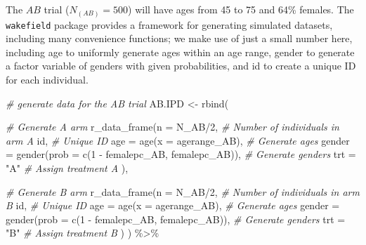 \documentclass[
]{article}
\newenvironment{Shaded}{\begin{snugshade}}{\end{snugshade}}
\newcommand{\AttributeTok}[1]{\textcolor[rgb]{0.77,0.63,0.00}{#1}}
\newcommand{\CommentTok}[1]{\textcolor[rgb]{0.56,0.35,0.01}{\textit{#1}}}
\newcommand{\DecValTok}[1]{\textcolor[rgb]{0.00,0.00,0.81}{#1}}
\newcommand{\FunctionTok}[1]{\textcolor[rgb]{0.00,0.00,0.00}{#1}}
\newcommand{\NormalTok}[1]{#1}
\newcommand{\OtherTok}[1]{\textcolor[rgb]{0.56,0.35,0.01}{#1}}
\newcommand{\SpecialCharTok}[1]{\textcolor[rgb]{0.00,0.00,0.00}{#1}}
\newcommand{\StringTok}[1]{\textcolor[rgb]{0.31,0.60,0.02}{#1}}
\begin{document}
The \(AB\) trial (\(N_{(AB)}=500\)) will have ages from 45 to 75 and
64\% females. The \texttt{wakefield} package provides a framework for
generating simulated datasets, including many convenience functions; we
make use of just a small number here, including age to uniformly
generate ages within an age range, gender to generate a factor variable
of genders with given probabilities, and id to create a unique ID for
each individual.

\begin{Shaded}
\begin{Highlighting}[]
\CommentTok{\# generate data for the AB trial}
\NormalTok{AB.IPD }\OtherTok{\textless{}{-}}
  \FunctionTok{rbind}\NormalTok{(}
    
    \CommentTok{\# Generate A arm}
    \FunctionTok{r\_data\_frame}\NormalTok{(}\AttributeTok{n =}\NormalTok{ N\_AB}\SpecialCharTok{/}\DecValTok{2}\NormalTok{, }\CommentTok{\# Number of individuals in arm A}
\NormalTok{                 id, }\CommentTok{\# Unique ID}
                 \AttributeTok{age =} \FunctionTok{age}\NormalTok{(}\AttributeTok{x =}\NormalTok{ agerange\_AB), }\CommentTok{\# Generate ages}
                 \AttributeTok{gender =} \FunctionTok{gender}\NormalTok{(}\AttributeTok{prob =} \FunctionTok{c}\NormalTok{(}\DecValTok{1} \SpecialCharTok{{-}}\NormalTok{ femalepc\_AB, femalepc\_AB)), }\CommentTok{\# Generate genders}
                 \AttributeTok{trt =} \StringTok{"A"} \CommentTok{\# Assign treatment A}
\NormalTok{    ),}
    
    \CommentTok{\# Generate B arm}
    \FunctionTok{r\_data\_frame}\NormalTok{(}\AttributeTok{n =}\NormalTok{ N\_AB}\SpecialCharTok{/}\DecValTok{2}\NormalTok{, }\CommentTok{\# Number of individuals in arm B}
\NormalTok{                 id, }\CommentTok{\# Unique ID}
                 \AttributeTok{age =} \FunctionTok{age}\NormalTok{(}\AttributeTok{x =}\NormalTok{ agerange\_AB), }\CommentTok{\# Generate ages}
                 \AttributeTok{gender =} \FunctionTok{gender}\NormalTok{(}\AttributeTok{prob =} \FunctionTok{c}\NormalTok{(}\DecValTok{1} \SpecialCharTok{{-}}\NormalTok{ femalepc\_AB, femalepc\_AB)), }\CommentTok{\# Generate genders}
                 \AttributeTok{trt =} \StringTok{"B"} \CommentTok{\# Assign treatment B}
\NormalTok{    )}
\NormalTok{  ) }\SpecialCharTok{\%\textgreater{}\%}
  

\end{Highlighting}
\end{Shaded}
\end{document}
